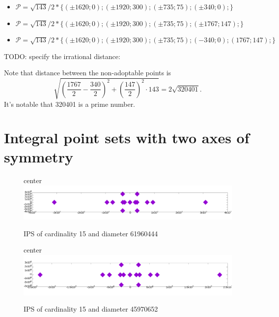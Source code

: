 \documentclass[12pt]{article}
\theoremstyle{theorem}
\theoremstyle{dfn}
\theoremstyle{remark}
\begin{document}
\begin{itemize}
\item
$\mathcal{P}=\sqrt{143}/2*\{
( \pm1620 ; 0);
( \pm1920 ; 300);
( \pm735 ; 75);
( \pm340 ; 0);
\}$

\item
$\mathcal{P}=\sqrt{143}/2*\{
( \pm1620 ; 0);
( \pm1920 ; 300);
( \pm735 ; 75);
( \pm1767 ; 147);
\}$

\item
$\mathcal{P}=
\sqrt{143}/2*\{
( \pm1620 ; 0);
( \pm1920 ; 300);
( \pm735 ; 75);
( -340 ; 0);
( 1767 ; 147);
\}$

\end{itemize}
TODO: specify the irrational distance:

Note that distance between the non-adoptable points is
\begin{equation}
	\sqrt{\left(\frac{1767}{2} - \frac{340}{2}\right)^2 + \left(\frac{147}{2}\right)^2\cdot143} = 2\sqrt{320401}
	.
\end{equation}
It's notable that 320401 is a prime number.

\section{Integral point sets with two axes of symmetry}

\begin{figure}[h!]
center{\includegraphics[width=1\linewidth]{./img/15_61960444_1_other.png}}
\parbox{1\linewidth}{\caption{IPS of cardinality 15 and diameter 61960444}
\label{15_61960444_1.png}}
\end{figure}

\begin{figure}[h!]
center{\includegraphics[width=1\linewidth]{./img/15_45970652_1_other.png}}
\parbox{1\linewidth}{\caption{IPS of cardinality 15 and diameter 45970652}
\label{15_45970652_1.png}}
\end{figure}
\end{document}

